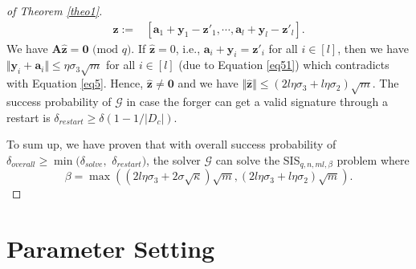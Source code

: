 \documentclass[runningheads]{llncs}
\begin{document}
\begin{proof}[of Theorem \ref{theo1}]
\begin{align*}
	\widehat{\mathbf{z}}:=&[\mathbf{a}_1+\mathbf{y}_1-\mathbf{z}'_{1},\cdots,\mathbf{a}_l+\mathbf{y}_l-\mathbf{z}'_{l}].
	\end{align*}
	We have $\mathbf{A}\widehat{\mathbf{z}}=\mathbf{0}\text{ (mod } q)$. If 	$\widehat{\mathbf{z}}=0$, i.e., $ \mathbf{a}_i+\mathbf{y}_i=\mathbf{z}'_{i} $ for all $i \in [l]$, then we have $\Vert \mathbf{y}_{i}+\mathbf{a}_{i} \Vert \leq \eta \sigma_3 \sqrt{m} $ for all $i \in [l]$ (due to Equation \eqref{eq51})  which contradicts with Equation \eqref{eq5}. Hence, $\widehat{\mathbf{z}} \neq \mathbf{0}$ and we have $\Vert\widehat{\mathbf{z}} \Vert \leq (2l\eta\sigma_3+l\eta\sigma_2)\sqrt{m}$.  The success probability of  $\mathcal{G}$ in case the forger can get a valid signature through a restart is $\delta_{restart} \geq \delta(1-1/|D_c|)$.
	
	
 
 
	
	To sum up, we have proven that with overall success probability of $\delta_{overall} \geq \min (\delta_{solve},$ $ \delta_{restart})$, the solver $\mathcal{G}$ can solve the \textsf{SIS}$_{q,n,ml, \beta}$ problem where $$\beta=\max( (2l\eta\sigma_3+2\sigma\sqrt{\kappa})\sqrt{m}, (2l\eta\sigma_3+l\eta\sigma_2)\sqrt{m}).$$
\end{proof}	


\section{Parameter Setting}  \label{paraset}
\end{document}
